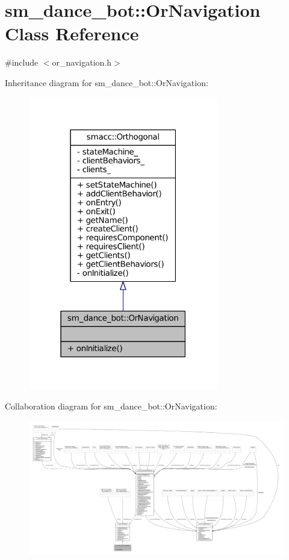 \hypertarget{classsm__dance__bot_1_1OrNavigation}{}\section{sm\+\_\+dance\+\_\+bot\+:\+:Or\+Navigation Class Reference}
\label{classsm__dance__bot_1_1OrNavigation}


{\ttfamily \#include $<$or\+\_\+navigation.\+h$>$}



Inheritance diagram for sm\+\_\+dance\+\_\+bot\+:\+:Or\+Navigation\+:
\nopagebreak
\begin{figure}[H]
\begin{center}
\leavevmode
\includegraphics[width=235pt]{classsm__dance__bot_1_1OrNavigation__inherit__graph}
\end{center}
\end{figure}


Collaboration diagram for sm\+\_\+dance\+\_\+bot\+:\+:Or\+Navigation\+:
\nopagebreak
\begin{figure}[H]
\begin{center}
\leavevmode
\includegraphics[width=350pt]{classsm__dance__bot_1_1OrNavigation__coll__graph}
\end{center}
\end{figure}
